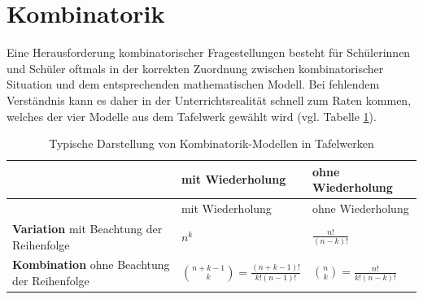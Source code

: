 \documentclass[
]{scrbook}
\theoremstyle{definition}
\theoremstyle{definition}
\theoremstyle{definition}
\theoremstyle{definition}
\theoremstyle{remark}
\begin{document}
\section{Kombinatorik}\label{kombinatorik}

Eine Herausforderung kombinatorischer Fragestellungen besteht für Schülerinnen und Schüler oftmals in der korrekten Zuordnung zwischen kombinatorischer Situation und dem entsprechenden mathematischen Modell. Bei fehlendem Verständnis kann es daher in der Unterrichtsrealität schnell zum Raten kommen, welches der vier Modelle aus dem Tafelwerk gewählt wird (vgl. Tabelle \ref{tab:kombinatorik-tafelwerk}).

\begin{longtable}[]{@{}
  >{\raggedright\arraybackslash}p{}
  >{\centering\arraybackslash}p{}
  >{\centering\arraybackslash}p{}@{}}
\caption{\label{tab:kombinatorik-tafelwerk} Typische Darstellung von Kombinatorik-Modellen in Tafelwerken}\tabularnewline
\toprule\noalign{}
\begin{minipage}[b]{\linewidth}\raggedright
\href{}{}
\end{minipage} & \begin{minipage}[b]{\linewidth}\centering
mit Wiederholung
\end{minipage} & \begin{minipage}[b]{\linewidth}\centering
ohne Wiederholung
\end{minipage} \\
\midrule\noalign{}
\endfirsthead
\toprule\noalign{}
\begin{minipage}[b]{\linewidth}\raggedright
\href{}{}
\end{minipage} & \begin{minipage}[b]{\linewidth}\centering
mit Wiederholung
\end{minipage} & \begin{minipage}[b]{\linewidth}\centering
ohne Wiederholung
\end{minipage} \\
\midrule\noalign{}
\endhead
\bottomrule\noalign{}
\endlastfoot
\textbf{Variation} mit Beachtung der Reihenfolge & \(n^k\) & \(\frac{n!}{(n-k)!}\) \\
\textbf{Kombination} ohne Beachtung der Reihenfolge & \(\binom{n+k-1}{k} = \frac{(n+k-1)!}{k!(n-1)!}\) & \(\binom{n}{k}=\frac{n!}{k!(n-k)!}\) \\
\end{longtable}
\end{document}
